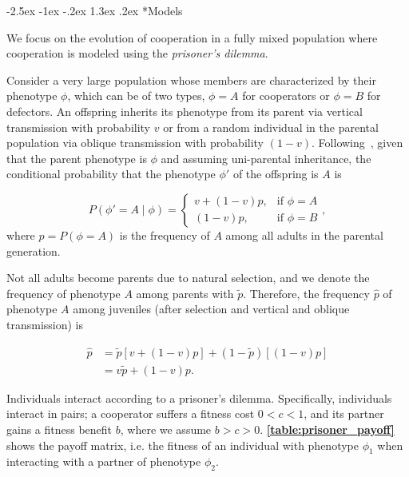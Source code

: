 \documentclass[12pt]{extarticle}
\makeatletter
\renewcommand\section{\@startsection {section}{1}{\z@}%
     {-2.5ex \@plus -1ex \@minus -.2ex}%
     {1.3ex \@plus.2ex}%
    {\Large\bfseries}}
\makeatother
\begin{document}
\section*{Models}

We focus on the evolution of cooperation in a fully mixed population where cooperation is modeled using the \emph{prisoner's dilemma}. %

Consider a very large population whose members are characterized by their phenotype $\phi$, which can be of two types, $\phi=A$ for cooperators or $\phi=B$ for defectors.
An offspring inherits its phenotype from its parent via vertical transmission with probability $v$ or from a random individual in the parental population via oblique transmission with probability $(1-v)$. 
Following~\citet{ram2018evolution}, given that the parent phenotype is $\phi$ and assuming uni-parental inheritance, %
the conditional probability that the phenotype $\phi'$ of the offspring is $A$ is 

\begin{equation} \label{eq:vertical_oblique_transmission}
P(\phi'=A \mid \phi) = \begin{cases}
v + (1-v)p, & \text{if } \phi=A \\
(1-v)p, & \text{if } \phi=B
\end{cases},
\end{equation}
where $p=P(\phi=A)$ is the frequency of $A$ among all adults in the parental generation.  

Not all adults become parents due to natural selection, and we denote the frequency of phenotype $A$ among parents with $\tilde{p}$.
Therefore, the frequency $\hat{p}$ of  phenotype $A$ among juveniles (after selection and vertical and oblique transmission) is

\begin{equation}\label{eq:horizontal}
\begin{aligned}
\hat{p}
& = \tilde{p} [v + (1-v)p] + (1-\tilde{p}) [(1-v)p] \\
& = v \tilde{p} + (1-v) p.
\end{aligned}
\end{equation}

Individuals interact according to a prisoner's dilemma.
Specifically, individuals interact in pairs; a cooperator suffers a fitness cost $0<c<1$, and its partner gains a fitness benefit $b$, where we assume $b>c>0$. \textbf{\autoref{table:prisoner_payoff}} shows the payoff matrix, i.e. the fitness of an individual with phenotype $\phi_1$ when interacting with a partner of phenotype $\phi_2$.
\end{document}
